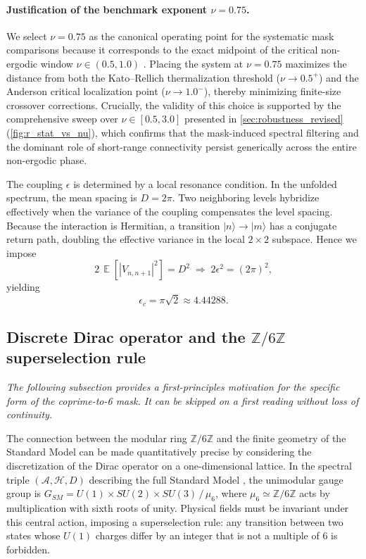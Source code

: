 \documentclass[11pt,a4paper]{article}
\newcommand{\Hilb}{\mathcal{H}}
\newcommand{\Zmod}{\mathbb{Z}/6\mathbb{Z}}
\DeclareMathOperator{\E}{\mathbb{E}}
\begin{document}
\paragraph{Justification of the benchmark exponent $\nu = 0.75$.}
We select $\nu = 0.75$ as the canonical operating point for the systematic mask comparisons because it corresponds to the exact midpoint of the critical non-ergodic window $\nu \in (0.5, 1.0)$ \cite{Mirlin1996}. Placing the system at $\nu = 0.75$ maximizes the distance from both the Kato--Rellich thermalization threshold ($\nu \to 0.5^+$) and the Anderson critical localization point ($\nu \to 1.0^-$), thereby minimizing finite-size crossover corrections. Crucially, the validity of this choice is supported by the comprehensive sweep over $\nu \in [0.5, 3.0]$ presented in \cref{sec:robustness_revised} (\cref{fig:r_stat_vs_nu}), which confirms that the mask-induced spectral filtering and the dominant role of short-range connectivity persist generically across the entire non-ergodic phase.

The coupling $\epsilon$ is determined by a local resonance condition. In the unfolded spectrum, the mean spacing is $D=2\pi$. Two neighboring levels hybridize effectively when the variance of the coupling compensates the level spacing. Because the interaction is Hermitian, a transition $|n\rangle\to|m\rangle$ has a conjugate return path, doubling the effective variance in the local $2\times2$ subspace. Hence we impose
\begin{equation}
2\,\E[|V_{n,n+1}|^2] = D^2 \;\Longrightarrow\; 2\epsilon^2 = (2\pi)^2,
\end{equation}
yielding
\begin{equation}
\boxed{\epsilon_c = \pi\sqrt{2} \approx 4.44288}.
\label{eq:epsilon}
\end{equation}

\subsection{Discrete Dirac operator and the \texorpdfstring{$\Zmod$}{Z/6Z}
superselection rule}
\label{subsec:dirac_operator}

\textit{The following subsection provides a first-principles motivation for
the specific form of the coprime-to-6 mask. It can be skipped on a first
reading without loss of continuity.}

The connection between the modular ring $\Zmod$ and the finite geometry of the Standard Model can be made quantitatively precise by considering the discretization of the Dirac operator on a one-dimensional lattice. In the spectral triple $(\mathcal{A}, \Hilb, D)$ describing the full Standard Model \cite{Connes2008,Chamseddine2007}, the unimodular gauge group is $G_{SM}=U(1)\times SU(2)\times SU(3)\,/\,\mu_6$, where $\mu_6\simeq\Zmod$ acts by multiplication with sixth roots of unity. Physical fields must be invariant under this central action, imposing a superselection rule: any transition between two states whose $U(1)$ charges differ by an integer that is not a multiple of 6 is forbidden.
\end{document}
